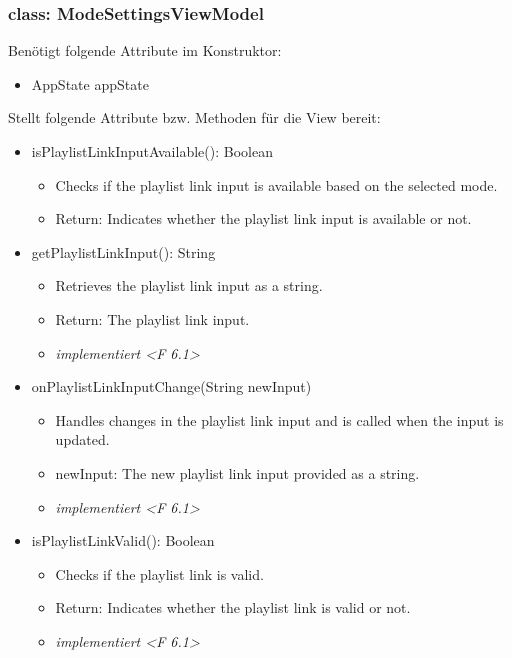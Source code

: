 \documentclass[oneside, ngerman]{sdqtechreport}
\begin{document}
\subsubsection{class: ModeSettingsViewModel}

Benötigt folgende Attribute im Konstruktor:
\begin{itemize}
    \item AppState appState
\end{itemize}
Stellt folgende Attribute bzw. Methoden für die View bereit:
\begin{itemize}

    \item isPlaylistLinkInputAvailable(): Boolean
        \begin{itemize}
            \item Checks if the playlist link input is available based on the selected mode.
            \item Return: Indicates whether the playlist link input is available or not.
        \end{itemize}
    \item getPlaylistLinkInput(): String
        \begin{itemize}
            \item Retrieves the playlist link input as a string.
            \item Return: The playlist link input.
            \item \textit{implementiert <F 6.1>}
        \end{itemize}
    \item onPlaylistLinkInputChange(String newInput)
        \begin{itemize}
            \item Handles changes in the playlist link input and is called when the input is updated.
            \item newInput: The new playlist link input provided as a string.
            \item \textit{implementiert <F 6.1>}
        \end{itemize}
    \item isPlaylistLinkValid(): Boolean
        \begin{itemize}
            \item Checks if the playlist link is valid.
            \item Return: Indicates whether the playlist link is valid or not.
            \item \textit{implementiert <F 6.1>}

\end{itemize}
\end{itemize}
\end{document}
